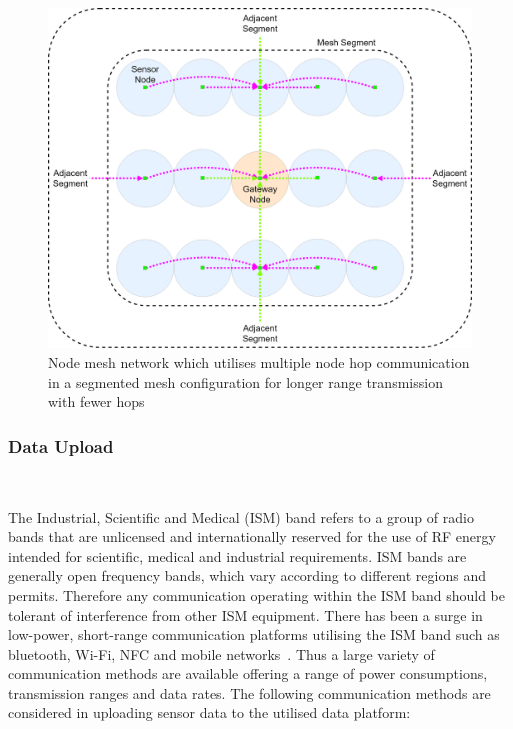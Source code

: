 \documentclass[10pt,twocolumn]{witseiepaper}
\begin{document}
			\begin{figure}
				\centering
				\includegraphics[width=1\columnwidth]{media/segment-mesh.png}
				\vspace{1em}
				\caption{Node mesh network which utilises multiple node hop communication in a segmented mesh configuration for longer range transmission with fewer hops}
				\raggedright
				\label{fig:segment}
			\end{figure}
	
		\subsubsection{Data Upload} $   $
		
			The Industrial, Scientific and Medical (ISM) band refers to a group of radio bands that are unlicensed and internationally reserved for the use of RF energy intended for scientific, medical and industrial requirements. ISM bands are generally open frequency bands, which vary according to different regions and permits. Therefore any communication operating within the ISM band should be tolerant of interference from other ISM equipment. There has been a surge in low-power, short-range communication platforms utilising the ISM band such as bluetooth, Wi-Fi, NFC and mobile networks~\cite{ism}. Thus a large variety of communication methods are available offering a range of power consumptions, transmission ranges and data rates. The following communication methods are considered in uploading sensor data to the utilised data platform:
			
\end{document}
